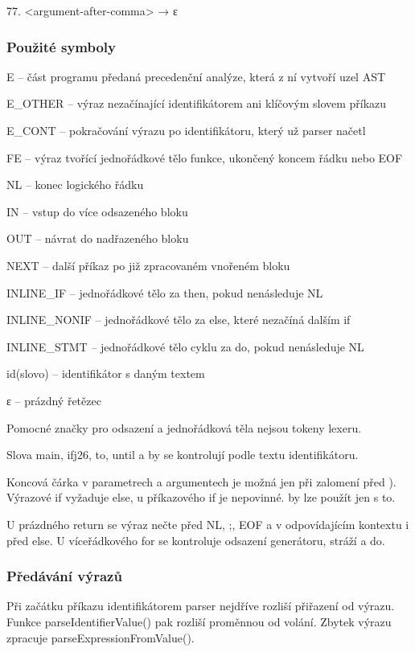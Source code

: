 \documentclass{article}
\begin{document}
77. \textless argument-after-comma\textgreater{} → ε

\newpage
\subsubsection{Použité symboly}

E -- část programu předaná precedenční analýze, která z ní vytvoří uzel AST

E\_OTHER -- výraz nezačínající identifikátorem ani klíčovým slovem příkazu

E\_CONT -- pokračování výrazu po identifikátoru, který už parser načetl

FE -- výraz tvořící jednořádkové tělo funkce, ukončený koncem řádku nebo EOF

NL -- konec logického řádku

IN -- vstup do více odsazeného bloku

OUT -- návrat do nadřazeného bloku

NEXT -- další příkaz po již zpracovaném vnořeném bloku

INLINE\_IF -- jednořádkové tělo za then, pokud nenásleduje NL

INLINE\_NONIF -- jednořádkové tělo za else, které nezačíná dalším if

INLINE\_STMT -- jednořádkové tělo cyklu za do, pokud nenásleduje NL

id(slovo) -- identifikátor s daným textem

ε -- prázdný řetězec

Pomocné značky pro odsazení a jednořádková těla nejsou tokeny lexeru.

Slova main, ifj26, to, until a by se kontrolují podle textu identifikátoru.

Koncová čárka v parametrech a argumentech je možná jen při zalomení před ). Výrazové if vyžaduje else, u příkazového if je nepovinné. by lze použít jen s to.

U prázdného return se výraz nečte před NL, ;, EOF a v odpovídajícím kontextu i před else. U víceřádkového for se kontroluje odsazení generátoru, stráží a do.

\subsubsection{Předávání výrazů}

Při začátku příkazu identifikátorem parser nejdříve rozliší přiřazení od výrazu. Funkce parseIdentifierValue() pak rozliší proměnnou od volání. Zbytek výrazu zpracuje parseExpressionFromValue().
\end{document}
